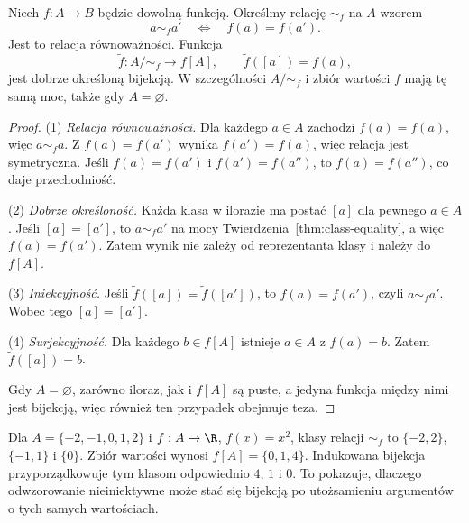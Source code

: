 \begin{twierdzenie}
\label{thm:first-isomorphism-functions-xliv}
Niech $f:A\to B$ będzie dowolną funkcją. Określmy relację
$\sim_f$ na $A$ wzorem
\[
 a\sim_f a'\quad\Longleftrightarrow\quad f(a)=f(a').
\]
Jest to relacja równoważności. Funkcja
\[
 \widetilde f:A/{\sim_f}\longrightarrow f[A],
 \qquad \widetilde f([a])=f(a),
\]
jest dobrze określoną bijekcją. W szczególności
$A/{\sim_f}$ i zbiór wartości $f$ mają tę samą moc,
także gdy $A=\varnothing$.
\end{twierdzenie}
\begin{proof}
(1) \emph{Relacja równoważności.} Dla każdego $a\in A$
zachodzi $f(a)=f(a)$, więc $a\sim_f a$.
Z $f(a)=f(a')$ wynika $f(a')=f(a)$, więc relacja jest
symetryczna. Jeśli $f(a)=f(a')$ i $f(a')=f(a'')$,
to $f(a)=f(a'')$, co daje przechodniość.

(2) \emph{Dobrze określoność.} Każda klasa w ilorazie
ma postać $[a]$ dla pewnego $a\in A$.
Jeśli $[a]=[a']$, to $a\sim_f a'$ na mocy
Twierdzenia~\ref{thm:class-equality}, a więc $f(a)=f(a')$.
Zatem wynik nie zależy od reprezentanta klasy i należy do $f[A]$.

(3) \emph{Iniekcyjność.} Jeśli
$\widetilde f([a])=\widetilde f([a'])$, to
$f(a)=f(a')$, czyli $a\sim_f a'$.
Wobec tego $[a]=[a']$.

(4) \emph{Surjekcyjność.} Dla każdego $b\in f[A]$
istnieje $a\in A$ z $f(a)=b$. Zatem
$\widetilde f([a])=b$.

Gdy $A=\varnothing$, zarówno iloraz, jak i $f[A]$
są puste, a jedyna funkcja między nimi jest bijekcją,
więc również ten przypadek obejmuje teza.
\end{proof}
\begin{przyklad}
Dla $A=\{-2,-1,0,1,2\}$ i $f:A\to\R$, $f(x)=x^2$,
klasy relacji $\sim_f$ to $\{-2,2\}$, $\{-1,1\}$ i
$\{0\}$. Zbiór wartości wynosi $f[A]=\{0,1,4\}$.
Indukowana bijekcja przyporządkowuje tym klasom
odpowiednio $4$, $1$ i $0$. To pokazuje, dlaczego
odwzorowanie nieiniektywne może stać się bijekcją
po utożsamieniu argumentów o tych samych wartościach.
\end{przyklad}
